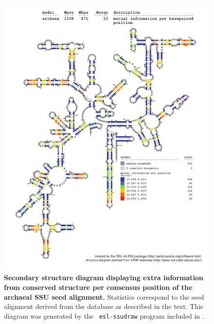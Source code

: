 \begin{figure}
\begin{center}
\includegraphics[width=5.7in]{Figures/archaea-0p1-mutinfo}
\end{center}
\caption[Secondary structure diagram displaying extra information 
  from conserved structure per consensus position of the archaeal SSU seed
  alignment]{\textbf{Secondary structure diagram displaying extra
  information from conserved structure per consensus position of the archaeal SSU seed
  alignment.} Statistics correspond to the  seed
  alignment derived from the  database \cite{CannoneGutell02}
  as described in the text. This diagram was generated by the {\tt
  esl-ssudraw} program included in .}
\label{fig:arcsinfo}
\end{figure}


